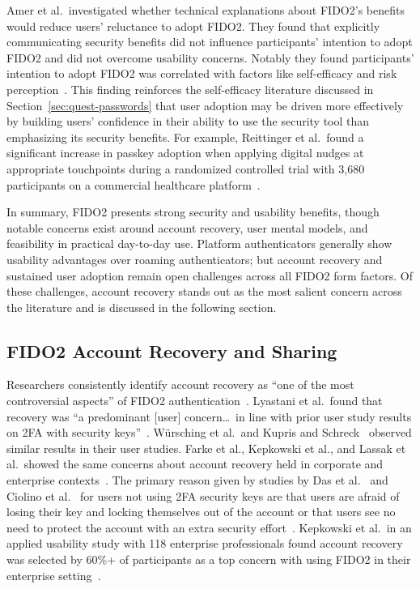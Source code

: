 Amer et al.\ investigated whether technical explanations about FIDO2's benefits would reduce users' reluctance to adopt FIDO2. They found that explicitly communicating security benefits did not influence participants' intention to adopt FIDO2 and did not overcome usability concerns. Notably they found participants' intention to adopt FIDO2 was correlated with factors like self-efficacy and risk perception~\cite{amer_fido2_2025}. This finding reinforces the self-efficacy literature discussed in Section~\ref{sec:quest-passwords} that user adoption may be driven more effectively by building users' confidence in their ability to use the security tool than emphasizing its security benefits. For example, Reittinger et al.\ found a significant increase in passkey adoption when applying digital nudges at appropriate touchpoints during a randomized controlled trial with 3{,}680 participants on a commercial healthcare platform~\cite{reittinger_passkey_2026}.

In summary, FIDO2 presents strong security and usability benefits, though notable concerns exist around account recovery, user mental models, and feasibility in practical day-to-day use. Platform authenticators generally show usability advantages over roaming authenticators; but account recovery and sustained user adoption remain open challenges across all FIDO2 form factors. Of these challenges, account recovery stands out as the most salient concern across the literature and is discussed in the following section.

\subsection{FIDO2 Account Recovery and Sharing}
\label{sec:fido2-recovery}

Researchers consistently identify account recovery as ``one of the most controversial aspects'' of FIDO2 authentication~\cite{buttner_passkey_2025}. Lyastani et al.\ found that recovery was ``a predominant [user] concern\ldots\ in line with prior user study results on 2FA with security keys''~\cite{lyastani_fido2_2020}. W\"ursching et al.\ and Kupris and Schreck~\cite{wursching_fido2_2023,kupris_passkey_2026} observed similar results in their user studies. Farke et al., Kepkowski et al., and Lassak et al.\ showed the same concerns about account recovery held in corporate and enterprise contexts~\cite{farke_security_2020,kepkowski_challenges_2023,lassak_why_2024}. The primary reason given by studies by Das et al.~\cite{das_johnny_2018} and Ciolino et al.~\cite{ciolino_twominds_2019} for users not using 2FA security keys are that users are afraid of losing their key and locking themselves out of the account or that users see no need to protect the account with an extra security effort~\cite{farke_security_2020}. Kepkowski et al.\ in an applied usability study with 118 enterprise professionals found account recovery was selected by 60\%+ of participants as a top concern with using FIDO2 in their enterprise setting~\cite{kepkowski_challenges_2023}.

